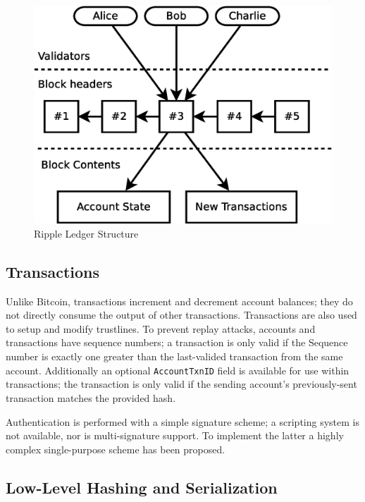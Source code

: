 \documentclass{article}
\begin{document}
\begin{figure}
    \centering
    \includegraphics[scale=0.35]{figures/ledger-blockchain.eps}
    \caption{Ripple Ledger Structure}
    \label{fig:ledger-blockchain}
\end{figure}


\subsection{Transactions}

Unlike Bitcoin, transactions increment and decrement account balances; they do
not directly consume the output of other transactions. Transactions are also
used to setup and modify trustlines. To prevent replay attacks, accounts and
transactions have sequence numbers; a transaction is only valid if the Sequence
number is exactly one greater than the last-valided transaction from the same
account. Additionally an optional \texttt{AccountTxnID} field is available for use
within transactions; the transaction is only valid if the sending account's
previously-sent transaction matches the provided hash.

Authentication is performed with a simple signature scheme; a scripting system
is not available, nor is multi-signature support. To implement the latter a
highly complex single-purpose scheme\cite{ripple-wiki-multisign} has been
proposed.


\subsection{Low-Level Hashing and Serialization}
\end{document}
